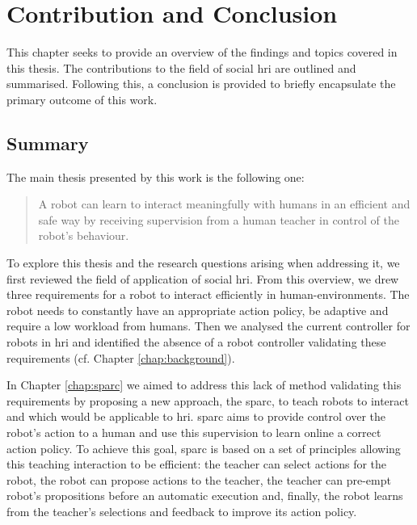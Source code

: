 \chapter{Contribution and Conclusion} \label{chap:conclusion}
\glsresetall
This chapter seeks to provide an overview of the findings and topics covered in this thesis. The contributions to the field of social \gls{hri} are outlined and summarised. Following this, a conclusion is provided to briefly encapsulate the primary outcome of this work.

\section{Summary}\label{sec:conc_summary}

The main thesis presented by this work is the following one: 
\begin{quote}
	A robot can learn to interact meaningfully with humans in an efficient and safe way by receiving supervision from a human teacher in control of the robot's behaviour. 
\end{quote}

To explore this thesis and the research questions arising when addressing it, we first reviewed the field of application of social \gls{hri}. From this overview, we drew three requirements for a robot to interact efficiently in human-environments. The robot needs to constantly have an appropriate action policy, be adaptive and require a low workload from humans. Then we analysed the current controller for robots in \gls{hri} and identified the absence of a robot controller validating these requirements (cf. Chapter \ref{chap:background}).

In Chapter \ref{chap:sparc} we aimed to address this lack of method validating this requirements by proposing a new approach, the \gls{sparc}, to teach robots to interact and which would be applicable to \gls{hri}. \gls{sparc} aims to provide control over the robot's action to a human and use this supervision to learn online a correct action policy. To achieve this goal, \gls{sparc} is based on a set of principles allowing this teaching interaction to be efficient: the teacher can select actions for the robot, the robot can propose actions to the teacher, the teacher can pre-empt robot's propositions before an automatic execution and, finally, the robot learns from the teacher's selections and feedback to improve its action policy.

